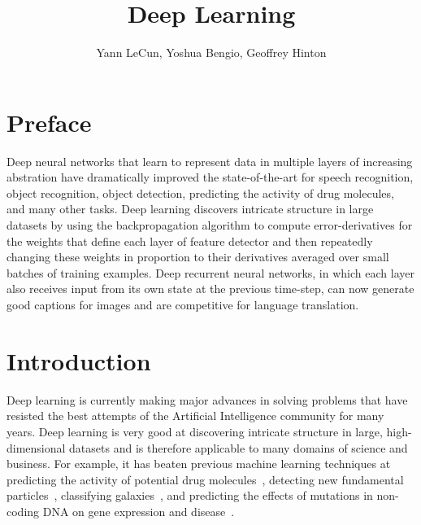 \documentclass[10pts]{article}
\title{Deep Learning}
\author{Yann LeCun, Yoshua Bengio, Geoffrey Hinton}
\begin{document}
\maketitle

\section{Preface}

Deep neural networks that learn to represent data in multiple layers
of increasing abstration have dramatically improved the
state-of-the-art for speech recognition, object recognition, object
detection, predicting the activity of drug molecules, and many other
tasks. Deep learning discovers intricate structure in large datasets
by using the backpropagation algorithm to compute error-derivatives
for the weights that define each layer of feature detector and then
repeatedly changing these weights in proportion to their derivatives
averaged over small batches of training examples.  Deep recurrent
neural networks, in which each layer also receives input from its own
state at the previous time-step, can now generate good captions for
images and are competitive for language translation.

\section{Introduction}

Deep learning is currently making major advances in solving problems
that have resisted the best attempts of the Artificial Intelligence
community for many years. Deep learning is very good at discovering
intricate structure in large, high-dimensional datasets and is
therefore applicable to many domains of science and business. For
example, it has beaten previous machine learning techniques at
predicting the activity of potential drug
molecules~\citep{Dahl-et-al-arxiv2014}, detecting new fundamental
particles~\citep{YANNparticles}, classifying
galaxies~\citep{YANNgalaxies}, and predicting the effects of mutations
in non-coding DNA on gene expression and
disease~\citep{Keung-et-al-2014}. %
\end{document}

